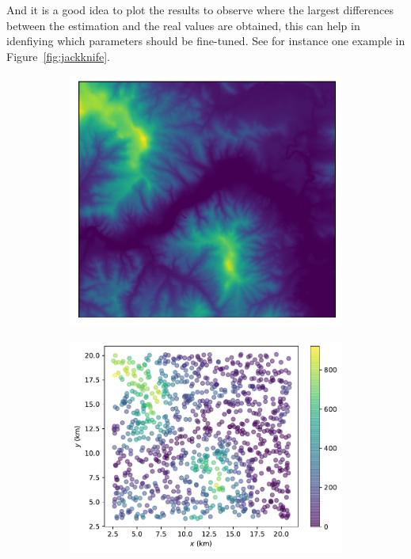 And it is a good idea to plot the results to observe where the largest differences between the estimation and the real values are obtained, this can help in idenfiying which parameters should be fine-tuned.
See for instance one example in Figure~\ref{fig:jackknife}.
\begin{figure}
  \centering
  \begin{subfigure}[b]{0.40\linewidth}
    \centering
    \includegraphics[width=\textwidth]{figs/jackknife/jk1.pdf}
    \caption{}
  \end{subfigure}
  \quad
  \begin{subfigure}[b]{0.475\linewidth}
    \centering
    \includegraphics[width=\textwidth]{figs/jackknife/jk2.pdf}

\end{subfigure}
\end{figure}
